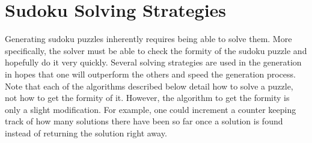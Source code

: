 
\section{Sudoku Solving Strategies}

Generating sudoku puzzles inherently requires being able to solve them. More specifically, the solver must be able to
check the formity of the sudoku puzzle and hopefully do it very quickly. Several solving strategies are used in the generation
in hopes that one will outperform the others and speed the generation process. Note that each of the algorithms described below
detail how to solve a puzzle, not how to get the formity of it. However, the algorithm to get the formity is only a slight
modification. For example, one could increment a counter keeping track of how many solutions there have been so far once
a solution is found instead of returning the solution right away.

